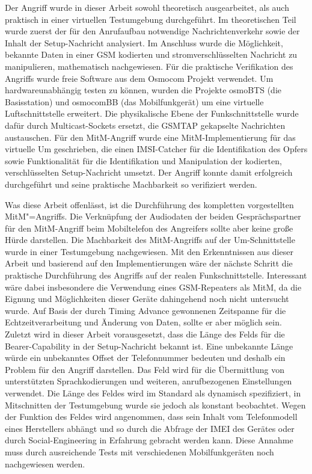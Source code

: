 Der Angriff wurde in dieser Arbeit sowohl theoretisch ausgearbeitet, als auch praktisch in einer virtuellen Testumgebung durchgeführt. Im theoretischen Teil wurde zuerst der für den Anrufaufbau notwendige Nachrichtenverkehr sowie der Inhalt der Setup-Nachricht analysiert. Im Anschluss wurde die Möglichkeit, bekannte Daten in einer \ac{GSM} kodierten und stromverschlüsselten Nachricht zu manipulieren, mathematisch nachgewiesen. Für die praktische Verifikation des Angriffs wurde freie Software aus dem Osmocom Projekt verwendet. Um hardwareunabhängig testen zu können, wurden die Projekte osmoBTS (die Basisstation) und osmocomBB (das Mobilfunkgerät) um eine virtuelle Luftschnittstelle erweitert. Die physikalische Ebene der Funkschnittstelle wurde dafür durch Multicast-Sockets ersetzt, die \ac{GSMTAP} gekapselte Nachrichten austauschen. Für den \ac{MitM}-Angriff wurde eine \ac{MitM}-Implementierung für das virtuelle \ac{Um} geschrieben, die einen \ac{IMSI}-Catcher für die Identifikation des Opfers sowie Funktionalität für die Identifikation und Manipulation der kodierten, verschlüsselten Setup-Nachricht umsetzt. Der Angriff konnte damit erfolgreich durchgeführt und seine praktische Machbarkeit so verifiziert werden.

Was diese Arbeit offenlässt, ist die Durchführung des kompletten vorgestellten \ac{MitM}"=Angriffs. Die Verknüpfung der Audiodaten der beiden Gesprächspartner für den \ac{MitM}-Angriff beim Mobiltelefon des Angreifers sollte aber keine große Hürde darstellen. Die Machbarkeit des \ac{MitM}-Angriffs auf der \ac{Um}-Schnittstelle wurde in einer Testumgebung nachgewiesen. Mit den Erkenntnissen aus dieser Arbeit und basierend auf den Implementierungen wäre der nächste Schritt die praktische Durchführung des Angriffs auf der realen Funkschnittstelle. Interessant wäre dabei insbesondere die Verwendung eines \ac{GSM}-Repeaters als \ac{MitM}, da die Eignung und Möglichkeiten dieser Geräte dahingehend noch nicht untersucht wurde. Auf Basis der durch Timing Advance gewonnenen Zeitspanne für die Echtzeitverarbeitung und Änderung von Daten, sollte er aber möglich sein. Zuletzt wird in dieser Arbeit vorausgesetzt, dass die Länge des Felds für die Bearer-Capability in der Setup-Nachricht bekannt ist. Eine unbekannte Länge würde ein unbekanntes Offset der Telefonnummer bedeuten und deshalb ein Problem für den Angriff darstellen. Das Feld wird für die Übermittlung von unterstützten Sprachkodierungen und weiteren, anrufbezogenen Einstellungen verwendet. Die Länge des Feldes wird im Standard als dynamisch spezifiziert, in Mitschnitten der Testumgebung wurde sie jedoch als konstant beobachtet. Wegen der Funktion des Feldes wird angenommen, dass sein Inhalt vom Telefonmodell eines Herstellers abhängt und so durch die Abfrage der \ac{IMEI} des Gerätes oder durch Social-Engineering in Erfahrung gebracht werden kann. Diese Annahme muss durch ausreichende Tests mit verschiedenen Mobilfunkgeräten noch nachgewiesen werden.

